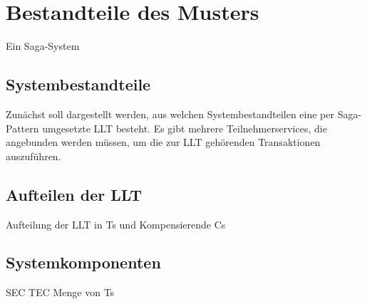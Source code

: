 \section{Bestandteile des Musters}

Ein Saga-System 

\subsection{Systembestandteile}
Zunächst soll dargestellt werden, aus welchen Systembestandteilen eine per Saga-Pattern umgesetzte LLT besteht. Es gibt mehrere Teilnehmerservices, die angebunden werden müssen, um die zur LLT gehörenden Transaktionen auszuführen. 


\subsection{Aufteilen der LLT}
Aufteilung der LLT in Ts und Kompensierende Cs

\subsection{Systemkomponenten}
SEC
TEC
Menge von Ts



